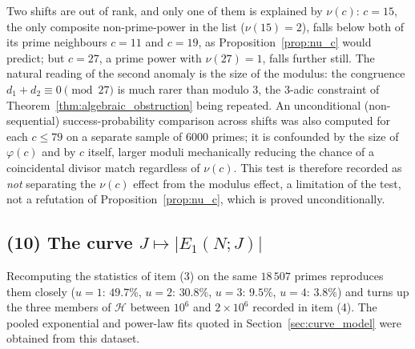 \documentclass[11pt, a4paper]{article}
\theoremstyle{plain}
\theoremstyle{definition}
\begin{document}
Two shifts are out of rank, and only one of them is explained by $\nu(c)$: $c=15$, the only composite non-prime-power in the list ($\nu(15)=2$), falls below both of its prime neighbours $c=11$ and $c=19$, as Proposition~\ref{prop:nu_c} would predict; but $c=27$, a prime power with $\nu(27)=1$, falls further still. The natural reading of the second anomaly is the size of the modulus: the congruence $d_1+d_2\equiv0\pmod{27}$ is much rarer than modulo $3$, the $3$-adic constraint of Theorem~\ref{thm:algebraic_obstruction} being repeated. An unconditional (non-sequential) success-probability comparison across shifts was also computed for each $c\le79$ on a separate sample of $6000$ primes; it is confounded by the size of $\varphi(c)$ and by $c$ itself, larger moduli mechanically reducing the chance of a coincidental divisor match regardless of $\nu(c)$. This test is therefore recorded as \emph{not} separating the $\nu(c)$ effect from the modulus effect, a limitation of the test, not a refutation of Proposition~\ref{prop:nu_c}, which is proved unconditionally.

\subsection*{(10) The curve $J\mapsto|E_1(N;J)|$}
Recomputing the statistics of item (3) on the same $18\,507$ primes reproduces them closely ($u=1$: $49.7\%$, $u=2$: $30.8\%$, $u=3$: $9.5\%$, $u=4$: $3.8\%$) and turns up the three members of $\mathcal{H}$ between $10^{6}$ and $2\times10^{6}$ recorded in item (4). The pooled exponential and power-law fits quoted in Section~\ref{sec:curve_model} were obtained from this dataset.
\end{document}
